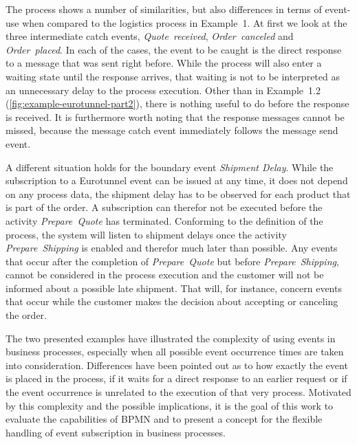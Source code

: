 The process shows a number of similarities, but also differences in terms of event-use when compared to the logistics process in Example~1.
At first we look at the three intermediate catch events, \textit{Quote~received}, \textit{Order~canceled} and \textit{Order~placed}.
In each of the cases, the event to be caught is the direct response to a message that was sent right before. While the process will also enter a waiting state until the response arrives, that waiting is not to be interpreted as an unnecessary delay to the process execution.
Other than in Example~1.2\,(\autoref{fig:example-eurotunnel-part2}), there is nothing useful to do before the response is received.
It is furthermore worth noting that the response messages cannot be missed, because the message catch event immediately follows the message send event.

A different situation holds for the boundary event \textit{Shipment Delay}.
While the subscription to a Eurotunnel event can be issued at any time, it does not depend on any process data, the shipment delay has to be observed for each product that is part of the order. A subscription can therefor not be executed before the activity \textit{Prepare~Quote} has terminated. 
Conforming to the definition of the process, the system will listen to shipment delays once the activity \textit{Prepare~Shipping} is enabled and therefor much later than possible.
Any events that occur after the completion of \textit{Prepare~Quote} but before \textit{Prepare~Shipping}, cannot be considered in the process execution and the customer will not be informed about a possible late shipment. That will, for instance, concern events that occur while the customer makes the decision about accepting or canceling the order.


\medskip \noindent 
The two presented examples have illustrated the complexity of using events in business processes, especially when all possible event occurrence times are taken into consideration.
Differences have been pointed out as to how exactly the event is placed in the process, if it waits for a direct response to an earlier request or if the event occurrence is unrelated to the execution of that very process.
Motivated by this complexity and the possible implications, it is the goal of this work to evaluate the capabilities of BPMN and to present a concept for the flexible handling of event subscription in business processes.


